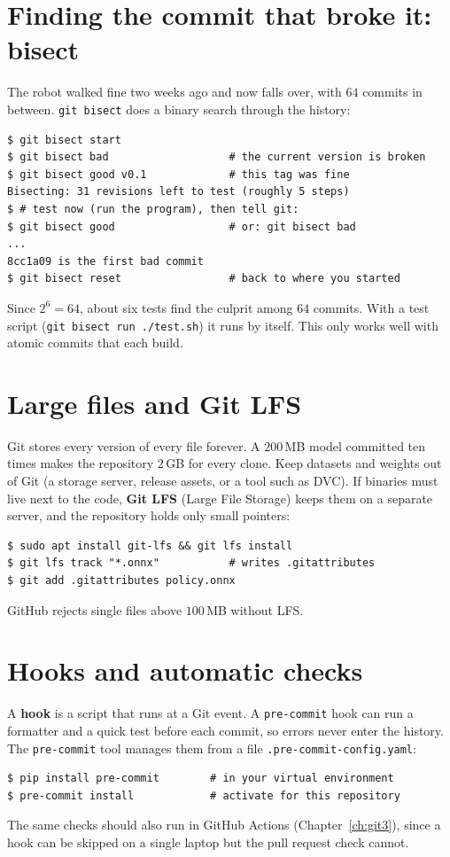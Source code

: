 \section*{Finding the commit that broke it: bisect}
The robot walked fine two weeks ago and now falls over, with $64$ commits in between. \texttt{git bisect} does a binary search through the history:
\begin{verbatim}
$ git bisect start
$ git bisect bad                   # the current version is broken
$ git bisect good v0.1             # this tag was fine
Bisecting: 31 revisions left to test (roughly 5 steps)
$ # test now (run the program), then tell git:
$ git bisect good                  # or: git bisect bad
...
8cc1a09 is the first bad commit
$ git bisect reset                 # back to where you started
\end{verbatim}
Since $2^6=64$, about six tests find the culprit among $64$ commits. With a test script (\verb!git bisect run ./test.sh!) it runs by itself. This only works well with atomic commits that each build.

\section*{Large files and Git LFS}
Git stores every version of every file forever. A $200$\,MB model committed ten times makes the repository $2$\,GB for every clone. Keep datasets and weights out of Git (a storage server, release assets, or a tool such as DVC). If binaries must live next to the code, \textbf{Git LFS} (Large File Storage) keeps them on a separate server, and the repository holds only small pointers:
\begin{verbatim}
$ sudo apt install git-lfs && git lfs install
$ git lfs track "*.onnx"           # writes .gitattributes
$ git add .gitattributes policy.onnx
\end{verbatim}
GitHub rejects single files above $100$\,MB without LFS.

\section*{Hooks and automatic checks}
A \textbf{hook} is a script that runs at a Git event. A \texttt{pre-commit} hook can run a formatter and a quick test before each commit, so errors never enter the history. The \texttt{pre-commit} tool manages them from a file \texttt{.pre-commit-config.yaml}:
\begin{verbatim}
$ pip install pre-commit        # in your virtual environment
$ pre-commit install            # activate for this repository
\end{verbatim}
The same checks should also run in GitHub Actions (Chapter~\ref{ch:git3}), since a hook can be skipped on a single laptop but the pull request check cannot.

